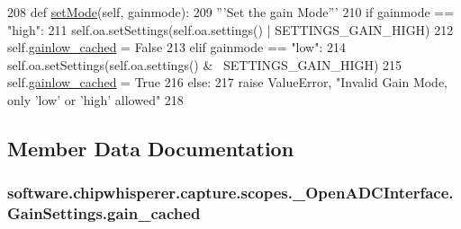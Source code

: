 \begin{DoxyCode}
208     \textcolor{keyword}{def }\hyperlink{classsoftware_1_1chipwhisperer_1_1capture_1_1scopes_1_1__OpenADCInterface_1_1GainSettings_a0258923992f3439f0c5cce42be208897}{setMode}(self, gainmode):
209         \textcolor{stringliteral}{'''Set the gain Mode'''}
210         \textcolor{keywordflow}{if} gainmode == \textcolor{stringliteral}{"high"}:
211             self.oa.setSettings(self.oa.settings() | SETTINGS\_GAIN\_HIGH)
212             self.\hyperlink{classsoftware_1_1chipwhisperer_1_1capture_1_1scopes_1_1__OpenADCInterface_1_1GainSettings_a3e63ec24ee836d894086be03fafab083}{gainlow\_cached} = \textcolor{keyword}{False}
213         \textcolor{keywordflow}{elif} gainmode == \textcolor{stringliteral}{"low"}:
214             self.oa.setSettings(self.oa.settings() & ~SETTINGS\_GAIN\_HIGH)
215             self.\hyperlink{classsoftware_1_1chipwhisperer_1_1capture_1_1scopes_1_1__OpenADCInterface_1_1GainSettings_a3e63ec24ee836d894086be03fafab083}{gainlow\_cached} = \textcolor{keyword}{True}
216         \textcolor{keywordflow}{else}:
217             \textcolor{keywordflow}{raise} ValueError, \textcolor{stringliteral}{"Invalid Gain Mode, only 'low' or 'high' allowed"}
218 
\end{DoxyCode}


\subsection{Member Data Documentation}
\hypertarget{classsoftware_1_1chipwhisperer_1_1capture_1_1scopes_1_1__OpenADCInterface_1_1GainSettings_a1054d1e2bc90679afc51d51cfe30ca7a}{}
\subsubsection[{gain\+\_\+cached}]{\setlength{\rightskip}{0pt plus 5cm}software.\+chipwhisperer.\+capture.\+scopes.\+\_\+\+Open\+A\+D\+C\+Interface.\+Gain\+Settings.\+gain\+\_\+cached}\label{classsoftware_1_1chipwhisperer_1_1capture_1_1scopes_1_1__OpenADCInterface_1_1GainSettings_a1054d1e2bc90679afc51d51cfe30ca7a}


